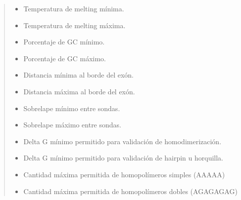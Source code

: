 \documentclass[letterpaper,10pt,spanish]{sphinxmanual}
\begin{document}
\begin{fulllineitems}
\begin{quote}
\begin{description}
\begin{itemize}
\item {} 
\sphinxAtStartPar
{} \textendash{} Temperatura de melting mínima.

\item {} 
\sphinxAtStartPar
{} \textendash{} Temperatura de melting máxima.

\item {} 
\sphinxAtStartPar
{} \textendash{} Porcentaje de GC mínimo.

\item {} 
\sphinxAtStartPar
{} \textendash{} Porcentaje de GC máximo.

\item {} 
\sphinxAtStartPar
{} \textendash{} Distancia mínima al borde del exón.

\item {} 
\sphinxAtStartPar
{} \textendash{} Distancia máxima al borde del exón.

\item {} 
\sphinxAtStartPar
{} \textendash{} Sobrelape mínimo entre sondas.

\item {} 
\sphinxAtStartPar
{} \textendash{} Sobrelape máximo entre sondas.

\item {} 
\sphinxAtStartPar
{} \textendash{} Delta G mínimo permitido para validación de homodimerización.

\item {} 
\sphinxAtStartPar
{} \textendash{} Delta G mínimo permitido para validación de hairpin u horquilla.

\item {} 
\sphinxAtStartPar
{} \textendash{} Cantidad máxima permitida de homopolímeros simples (AAAAA)

\item {} 
\sphinxAtStartPar
{} \textendash{} Cantidad máxima permitida de homopolímeros dobles (AGAGAGAG)


\end{itemize}
\end{description}
\end{quote}
\end{fulllineitems}
\end{document}
